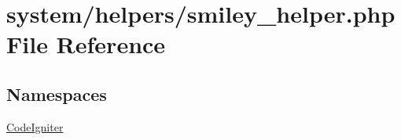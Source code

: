 \hypertarget{smiley__helper_8php}{\section{system/helpers/smiley\-\_\-helper.php File Reference}
\label{smiley__helper_8php}
}
\subsection*{Namespaces}
\begin{DoxyCompactItemize}
\item 
\hyperlink{namespace_code_igniter}{Code\-Igniter}
\end{DoxyCompactItemize}
